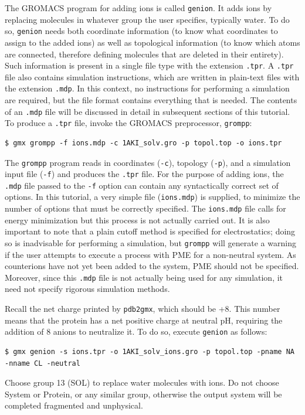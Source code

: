 \documentclass[9pt,tutorial,pubversion]{livecoms}
\begin{document}
The GROMACS program for adding ions is called \texttt{genion}. It adds ions by replacing molecules in whatever group the user specifies, typically water. To do so, \texttt{genion} needs both coordinate information (to know what coordinates to assign to the added ions) as well as topological information (to know which atoms are connected, therefore defining molecules that are deleted in their entirety). Such information is present in a single file type with the extension \texttt{.tpr}. A \texttt{.tpr} file also contains simulation instructions, which are written in plain-text files with the extension \texttt{.mdp}. In this context, no instructions for performing a simulation are required, but the file format contains everything that is needed. The contents of an \texttt{.mdp} file will be discussed in detail in subsequent sections of this tutorial. To produce a \texttt{.tpr} file, invoke the GROMACS preprocessor, \texttt{grompp}:

\begin{lstlisting}
$ gmx grompp -f ions.mdp -c 1AKI_solv.gro -p topol.top -o ions.tpr
\end{lstlisting}
%
The \texttt{grompp} program reads in coordinates (\texttt{-c}), topology (\texttt{-p}), and a simulation input file (\texttt{-f}) and produces the \texttt{.tpr} file. For the purpose of adding ions, the \texttt{.mdp} file passed to the \texttt{-f} option can contain any syntactically correct set of options. In this tutorial, a very simple file (\texttt{ions.mdp}) is supplied, to minimize the number of options that must be correctly specified. The \texttt{ions.mdp} file calls for energy minimization but this process is not actually carried out. It is also important to note that a plain cutoff method is specified for electrostatics; doing so is inadvisable for performing a simulation, but \texttt{grompp} will generate a warning if the user attempts to execute a process with PME for a non-neutral system. As counterions have not yet been added to the system, PME should not be specified. Moreover, since this \texttt{.mdp} file is not actually being used for any simulation, it need not specify rigorous simulation methods.

Recall the net charge printed by \texttt{pdb2gmx}, which should be +8. This number means that the protein has a net positive charge at neutral pH, requiring the addition of 8 anions to neutralize it. To do so, execute \texttt{genion} as follows:

\begin{lstlisting}
$ gmx genion -s ions.tpr -o 1AKI_solv_ions.gro -p topol.top -pname NA -nname CL -neutral
\end{lstlisting}
%
Choose group 13 (SOL) to replace water molecules with ions. Do not choose System or Protein, or any similar group, otherwise the output system will be completed fragmented and unphysical.
\end{document}
